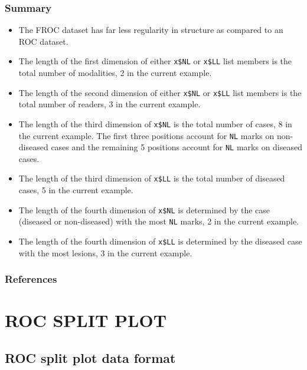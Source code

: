 \documentclass[]{book}
\providecommand{\tightlist}{%
  \setlength{\itemsep}{0pt}\setlength{\parskip}{0pt}}
\begin{document}
\hypertarget{summary}{%
\section{Summary}\label{summary}}

\begin{itemize}
\tightlist
\item
  The FROC dataset has far less regularity in structure as compared to an ROC dataset.
\item
  The length of the first dimension of either \texttt{x\$NL} or \texttt{x\$LL} list members is the total number of modalities, 2 in the current example.
\item
  The length of the second dimension of either \texttt{x\$NL} or \texttt{x\$LL} list members is the total number of readers, 3 in the current example.
\item
  The length of the third dimension of \texttt{x\$NL} is the total number of cases, 8 in the current example. The first three positions account for \texttt{NL} marks on non-diseased cases and the remaining 5 positions account for \texttt{NL} marks on diseased cases.
\item
  The length of the third dimension of \texttt{x\$LL} is the total number of diseased cases, 5 in the current example.
\item
  The length of the fourth dimension of \texttt{x\$NL} is determined by the case (diseased or non-diseased) with the most \texttt{NL} marks, 2 in the current example.
\item
  The length of the fourth dimension of \texttt{x\$LL} is determined by the diseased case with the most lesions, 3 in the current example.
\end{itemize}

\hypertarget{references-2}{%
\section{References}\label{references-2}}

\hypertarget{part-roc-split-plot}{%
\part*{ROC SPLIT PLOT}\label{part-roc-split-plot}}

\hypertarget{rocSpdataformat}{%
\chapter{ROC split plot data format}\label{rocSpdataformat}}
\end{document}
